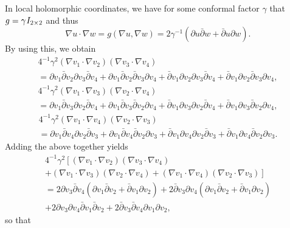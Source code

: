 \documentclass[12pt]{amsart}
\theoremstyle{definition}
\theoremstyle{remark}
\newcommand{\s}{\hspace{0.5pt}}
\begin{document}
In local holomorphic coordinates, we have for some conformal factor $\gamma$ that $g=\gamma\s I_{2\times 2}$ and thus
\begin{equation}
\nabla u\cdot\nabla w=g(\nabla u,\nabla w)=2\gamma^{-1}(\partial u\bar\partial w+\bar\partial u\partial w).
\end{equation}
By using this, we obtain
\begin{multline*}
4^{-1}\gamma^2(\nabla v_1\cdot \nabla v_2)(\nabla v_3\cdot\nabla v_4)\\[5pt]
= \partial v_1\bar\partial v_2\partial v_3\bar\partial v_4
+\partial v_1\bar\partial v_2\bar\partial v_3\partial v_4
+\bar\partial v_1\partial v_2\partial v_3\bar\partial v_4
+\bar\partial v_1\partial v_2\bar\partial v_3\partial v_4,
\end{multline*}
\begin{multline*}
4^{-1}\gamma^2(\nabla v_1\cdot\nabla v_3)(\nabla v_2\cdot\nabla v_4)\\[5pt]
= \partial v_1\bar\partial v_3\partial v_2\bar\partial v_4
+\partial v_1\bar\partial v_3\bar\partial v_2\partial v_4
+\bar\partial v_1\partial v_3\partial v_2\bar\partial v_4
+\bar\partial v_1\partial v_3\bar\partial v_2\partial v_4,
\end{multline*}
\begin{multline*}
4^{-1}\gamma^2(\nabla v_1\cdot\nabla v_4)(\nabla v_2\cdot\nabla v_3)\\[5pt]
= \partial v_1\bar\partial v_4\partial v_2\bar\partial v_3
+\partial v_1\bar\partial v_4\bar\partial v_2\partial v_3
+\bar\partial v_1\partial v_4\partial v_2\bar\partial v_3
+\bar\partial v_1\partial v_4\bar\partial v_2\partial v_3.
\end{multline*}
Adding the above together yields
\begin{multline*}
4^{-1}\gamma^2 \left[(\nabla v_1\cdot \nabla v_2)(\nabla v_3\cdot\nabla v_4)\right.\\[5pt]\left.+(\nabla v_1\cdot\nabla v_3)(\nabla v_2\cdot\nabla v_4)+(\nabla v_1\cdot\nabla v_4)(\nabla v_2\cdot\nabla v_3)\right]\\[5pt]
=2\partial v_3\bar\partial v_4\left(\partial v_1\bar\partial v_2+\bar\partial v_1\partial v_2\right)
+2\bar\partial v_3\partial v_4\left(\partial v_1\bar\partial v_2+\bar\partial v_1\partial v_2\right)\\[5pt]
+2\partial v_3\partial v_4\bar\partial v_1\bar\partial v_2
+2\bar\partial v_3\bar\partial v_4\partial v_1\partial v_2,
\end{multline*}
so that
\end{document}
